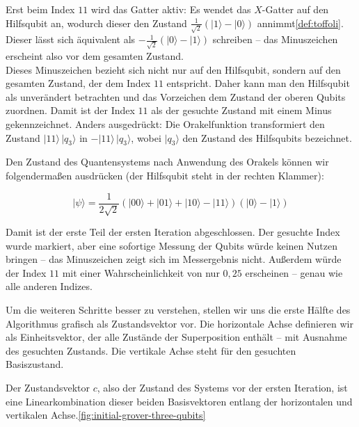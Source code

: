  Erst beim Index $11$ wird das Gatter aktiv: Es wendet das $X$-Gatter auf den Hilfsqubit an, wodurch dieser den Zustand $\frac{1}{\sqrt{2}}(|1\rangle - |0\rangle)$ annimmt\ref{def:toffoli}. Dieser lässt sich äquivalent als $-\frac{1}{\sqrt{2}}(|0\rangle - |1\rangle)$ schreiben – das Minuszeichen erscheint also vor dem gesamten Zustand.\\

 Dieses Minuszeichen bezieht sich nicht nur auf den Hilfsqubit, sondern auf den gesamten Zustand, der dem Index $11$ entspricht. Daher kann man den Hilfsqubit als unverändert betrachten und das Vorzeichen dem Zustand der oberen Qubits zuordnen. Damit ist der Index $11$ als der gesuchte Zustand mit einem Minus gekennzeichnet. Anders ausgedrückt: Die Orakelfunktion transformiert den Zustand $|11\rangle\,|q_{\text{3}}\rangle$ in $-|11\rangle\,|q_{\text{3}}\rangle$, wobei $|q_{\text{3}}\rangle$ den Zustand des Hilfsqubits bezeichnet.

Den Zustand des Quantensystems nach Anwendung des Orakels können wir folgendermaßen ausdrücken (der Hilfsqubit steht in der rechten Klammer):

$$
|\psi\rangle = \frac{1}{2\sqrt{2}} (|00\rangle + |01\rangle + |10\rangle - |11\rangle)(|0\rangle - |1\rangle)
$$

Damit ist der erste Teil der ersten Iteration abgeschlossen. Der gesuchte Index wurde markiert, aber eine sofortige Messung der Qubits würde keinen Nutzen bringen – das Minuszeichen zeigt sich im Messergebnis nicht. Außerdem würde der Index $11$ mit einer Wahrscheinlichkeit von nur $0{,}25$ erscheinen – genau wie alle anderen Indizes.

Um die weiteren Schritte besser zu verstehen, stellen wir uns die erste Hälfte des Algorithmus grafisch als Zustandsvektor vor. Die horizontale Achse definieren wir als Einheitsvektor, der alle Zustände der Superposition enthält – mit Ausnahme des gesuchten Zustands. Die vertikale Achse steht für den gesuchten Basiszustand.

Der Zustandsvektor $c$, also der Zustand des Systems vor der ersten Iteration, ist eine Linearkombination dieser beiden Basisvektoren entlang der horizontalen und vertikalen Achse.\ref{fig:initial-grover-three-qubits}

